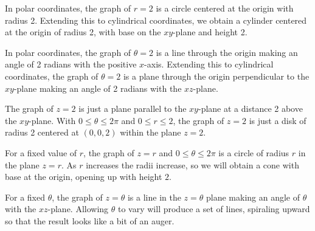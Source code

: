 \begin{activitySolution}
    \ba
    \item In polar coordinates, the graph of $r=2$ is a circle centered at the origin with radius 2. Extending this to cylindrical coordinates, we obtain a cylinder centered at the origin of radius 2, with base on the $xy$-plane and height 2. 

    \item In polar coordinates, the graph of $\theta = 2$ is a line through the origin making an angle of 2 radians with the positive $x$-axis. Extending this to cylindrical coordinates, the graph of $\theta=2$ is a plane through the origin perpendicular to the $xy$-plane making an angle of 2 radians with the $xz$-plane. 

    \item The graph of $z=2$ is just a plane parallel to the $xy$-plane at a distance 2 above the $xy$-plane. With $0 \leq \theta \leq 2\pi$ and $0 \leq r \leq 2$, the graph of $z=2$ is just a disk of radius 2 centered at $(0,0,2)$ within the plane $z=2$. 


    \item For a fixed value of $r$, the graph of $z=r$ and $0 \leq \theta \leq 2\pi$ is a circle of radius $r$ in the plane $z=r$. As $r$ increases the radii increase, so we will obtain a cone with base at the origin, opening up with height $2$. 

    \item For a fixed $\theta$, the graph of $z=\theta$ is a line in the $z = \theta$ plane making an angle of $\theta$ with the $xz$-plane. Allowing $\theta$ to vary will produce a set of lines, spiraling upward so that the result looks like a bit of an auger. 

    \ea
\end{activitySolution}
\aftera